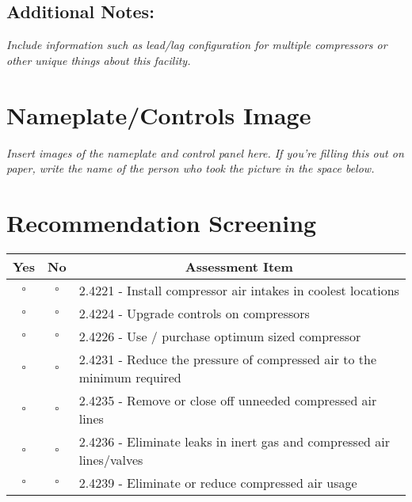 \documentclass[./main.tex]{subfiles}
\begin{document}
\vspace{1cm}

\subsection*{Additional Notes:}
\emph{Include information such as lead/lag configuration for multiple compressors or other unique things about this facility. }
\vspace{4cm}

\clearpage \section*{Nameplate/Controls Image}
\emph{Insert images of the nameplate and control panel here. If you're filling this out on paper, write the name of the person who took the picture in the space below. }

\vspace{12cm}


\section*{Recommendation Screening}
\begin{tabular}{|c|c|p{13.5cm}|}
\hline
\multicolumn{1}{|c|}{\textbf{Yes}} & \multicolumn{1}{c|}{\textbf{No}} & \multicolumn{1}{c|}{\textbf{Assessment Item}} \\
\hline
$\square$ & $\square$ & 2.4221 - Install compressor air intakes in coolest locations \\ \hline
$\square$ & $\square$ & 2.4224 - Upgrade controls on compressors \\ \hline
$\square$ & $\square$ & 2.4226 - Use / purchase optimum sized compressor \\ \hline
$\square$ & $\square$ & 2.4231 - Reduce the pressure of compressed air to the minimum required \\ \hline
$\square$ & $\square$ & 2.4235 - Remove or close off unneeded compressed air lines \\ \hline
$\square$ & $\square$ & 2.4236 - Eliminate leaks in inert gas and compressed air lines/valves \\ \hline
$\square$ & $\square$ & 2.4239 - Eliminate or reduce compressed air usage \\ \hline
\end{tabular}





\end{document}
